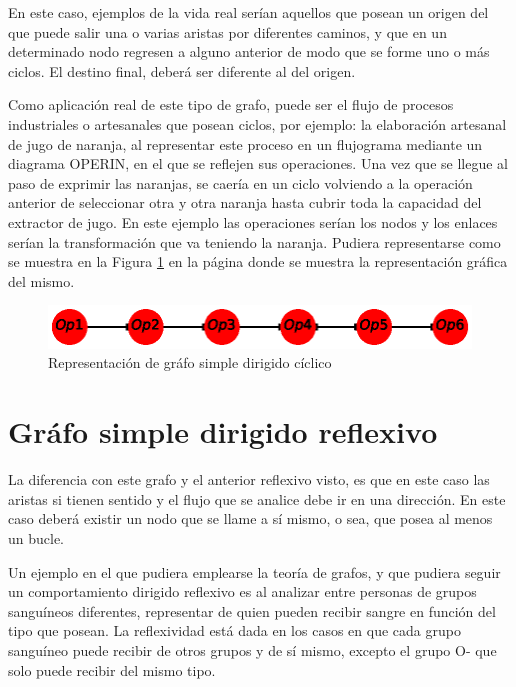 \documentclass{article}
\begin{document}
En este caso, ejemplos de la vida real serían aquellos que posean un origen del que puede salir una o varias aristas por diferentes caminos, y que en un determinado nodo regresen a alguno anterior de modo que se forme uno o más ciclos. El destino final, deberá ser diferente al del origen. 

Como aplicación real de este tipo de grafo, puede ser el flujo de procesos industriales o artesanales que posean ciclos, por ejemplo: la elaboración artesanal de jugo de naranja, al representar este proceso en un flujograma mediante un diagrama OPERIN, en el que se reflejen sus operaciones. Una vez que se llegue al paso de exprimir las naranjas, se caería en un ciclo volviendo a la operación anterior de seleccionar otra y otra naranja hasta cubrir toda la capacidad del extractor de jugo. En este ejemplo las operaciones serían los nodos  y los enlaces serían la transformación que va teniendo la naranja. Pudiera representarse como se muestra en la Figura \ref{fig:Fig05} en la página \pageref{fig:Fig05} donde se muestra la representación gráfica del mismo.




\begin{figure}
    \centering
    \includegraphics[scale=0.6]{imagenes/Fig05.eps}
    \caption{Representación de gráfo simple dirigido cíclico}
    \label{fig:Fig05}
\end{figure}

\section{Gráfo simple dirigido reflexivo}

La diferencia con este grafo y el anterior reflexivo visto, es que en este caso las aristas si tienen sentido y el flujo que se analice debe ir en una dirección. En este caso deberá existir un nodo que se llame a sí mismo, o sea, que posea al menos un bucle.

Un ejemplo en el que pudiera emplearse la teoría de grafos, y que pudiera seguir un comportamiento dirigido reflexivo es al analizar entre personas de grupos sanguíneos diferentes, representar de quien pueden recibir sangre en función del tipo que posean. La reflexividad está dada en los casos en que cada grupo sanguíneo puede recibir de otros grupos y de sí mismo, excepto el grupo O- que solo puede recibir del mismo tipo.
\end{document}
